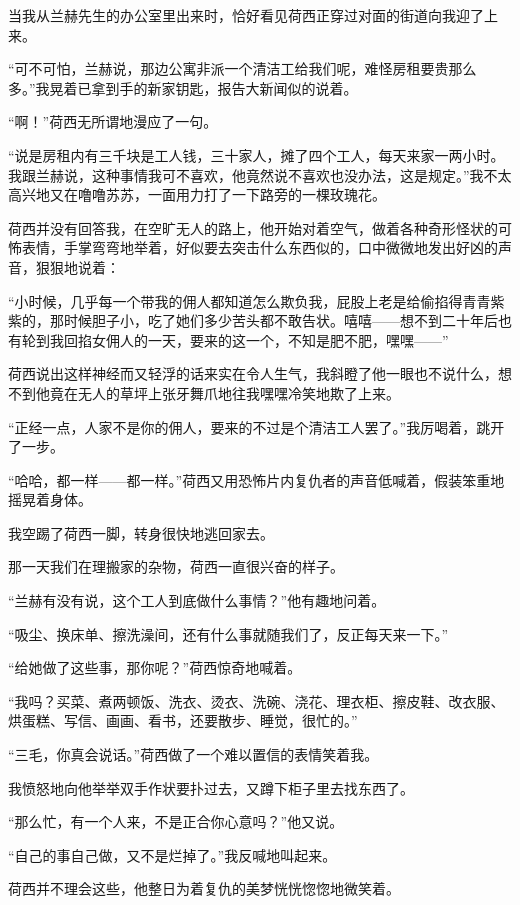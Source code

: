 \par 当我从兰赫先生的办公室里出来时，恰好看见荷西正穿过对面的街道向我迎了上来。
\par “可不可怕，兰赫说，那边公寓非派一个清洁工给我们呢，难怪房租要贵那么多。”我晃着已拿到手的新家钥匙，报告大新闻似的说着。
\par “啊！”荷西无所谓地漫应了一句。
\par “说是房租内有三千块是工人钱，三十家人，摊了四个工人，每天来家一两小时。我跟兰赫说，这种事情我可不喜欢，他竟然说不喜欢也没办法，这是规定。”我不太高兴地又在噜噜苏苏，一面用力打了一下路旁的一棵玫瑰花。
\par 荷西并没有回答我，在空旷无人的路上，他开始对着空气，做着各种奇形怪状的可怖表情，手掌弯弯地举着，好似要去突击什么东西似的，口中微微地发出好凶的声音，狠狠地说着：
\par “小时候，几乎每一个带我的佣人都知道怎么欺负我，屁股上老是给偷掐得青青紫紫的，那时候胆子小，吃了她们多少苦头都不敢告状。嘻嘻——想不到二十年后也有轮到我回掐女佣人的一天，要来的这一个，不知是肥不肥，嘿嘿——”
\par 荷西说出这样神经而又轻浮的话来实在令人生气，我斜瞪了他一眼也不说什么，想不到他竟在无人的草坪上张牙舞爪地往我嘿嘿冷笑地欺了上来。
\par “正经一点，人家不是你的佣人，要来的不过是个清洁工人罢了。”我厉喝着，跳开了一步。
\par “哈哈，都一样——都一样。”荷西又用恐怖片内复仇者的声音低喊着，假装笨重地摇晃着身体。
\par 我空踢了荷西一脚，转身很快地逃回家去。
\par 那一天我们在理搬家的杂物，荷西一直很兴奋的样子。
\par “兰赫有没有说，这个工人到底做什么事情？”他有趣地问着。
\par “吸尘、换床单、擦洗澡间，还有什么事就随我们了，反正每天来一下。”
\par “给她做了这些事，那你呢？”荷西惊奇地喊着。
\par “我吗？买菜、煮两顿饭、洗衣、烫衣、洗碗、浇花、理衣柜、擦皮鞋、改衣服、烘蛋糕、写信、画画、看书，还要散步、睡觉，很忙的。”
\par “三毛，你真会说话。”荷西做了一个难以置信的表情笑着我。
\par 我愤怒地向他举举双手作状要扑过去，又蹲下柜子里去找东西了。
\par “那么忙，有一个人来，不是正合你心意吗？”他又说。
\par “自己的事自己做，又不是烂掉了。”我反喊地叫起来。
\par 荷西并不理会这些，他整日为着复仇的美梦恍恍惚惚地微笑着。
